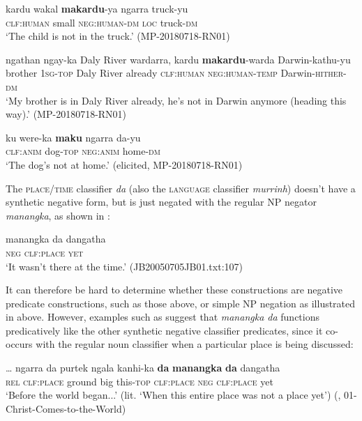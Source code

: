 \documentclass[output=paper,colorlinks,citecolor=brown]{langscibook}
\begin{document}
\ea\label{ex:mur:45}
    \gll kardu wakal \textbf{makardu}{}-ya ngarra truck-yu\\
         \textsc{clf:human} small \textsc{neg:human-dm} \textsc{loc} truck-\textsc{dm}\\
    \glt  ‘The child is not in the truck.’ (MP-20180718-RN01)
\z 

\ea\label{ex:mur:46}
    \gll ngathan ngay-ka Daly River wardarra, kardu \textbf{makardu}{}-warda Darwin-kathu-yu\\
         brother \textsc{1sg-top} Daly River already \textsc{clf:human} \textsc{neg:human-temp} Darwin-\textsc{hither-dm}\\
    \glt ‘My brother is in Daly River already, he’s not in Darwin anymore (heading this way).’ (MP-20180718-RN01) 
\z  

\ea\label{ex:mur:47}
    \gll ku were-ka \textbf{maku} {ngarra da}-yu\\
          \textsc{clf:anim} dog-\textsc{top} \textsc{neg:anim} home\textsc{{}-dm}\\
    \glt ‘The dog’s not at home.’ (elicited, MP-20180718-RN01)
\z

The \textsc{place/time} classifier \textit{da} (also the \textsc{language} classifier \textit{murrinh}) doesn’t have a synthetic negative form, but is just negated with the regular NP negator \textit{manangka}, as shown in :

\ea\label{ex:mur:48}
    \gll manangka da dangatha\\
         \textsc{neg} \textsc{clf:place} \textsc{yet}\\
    \glt ‘It wasn't there at the time.’ (JB20050705JB01.txt:107)
\z 

It can therefore be hard to determine whether these constructions are negative predicate constructions, such as those above, or simple NP negation as illustrated in  above. However, examples such as  suggest that \textit{manangka da} functions predicatively like the other synthetic negative classifier predicates, since it co-occurs with the regular noun classifier when a particular place is being discussed:

\ea\label{ex:mur:49}
    \gll  … ngarra da purtek ngala kanhi-ka \textbf{da} \textbf{manangka} \textbf{da} dangatha \\
         {} \textsc{rel} \textsc{clf:place} ground big this-\textsc{top} \textsc{clf:place} \textsc{neg} \textsc{clf:place} yet\\
    \glt ‘Before the world began...’ (lit. ‘When this entire place was not a place yet’) (\citealt{MansfieldEtAl2019}, 01-Christ-Comes-to-the-World)
\z  
\end{document}
